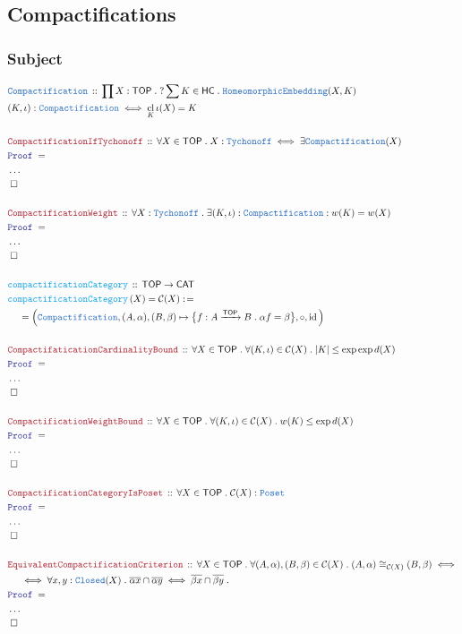\documentclass[12pt]{scrartcl}
\newcommand{\TYPE}[1]{\textcolor{NavyBlue}{\mathtt{#1}}}
\newcommand{\FUNC}[1]{\textcolor{Cerulean}{\mathtt{#1}}}
\newcommand{\LOGIC}[1]{\textcolor{Blue}{\mathtt{#1}}}
\newcommand{\THM}[1]{\textcolor{Maroon}{\mathtt{#1}}}
\renewcommand{\.}{\; . \;}
\newcommand{\de}{: \kern 0.1pc =}
\newcommand{\Act}[1]{\left( #1 \right)}
\newcommand{\Theorem}[2]{& \THM{#1} \, :: \, #2 \\ & \Proof = \\ }
\newcommand{\DeclareType}[2]{& \TYPE{#1} \, :: \, #2 \\}
\newcommand{\DefineType}[3]{& #1 : \TYPE{#2} \iff #3 \\}
\newcommand{\DeclareFunc}[2]{& \FUNC{#1} \, :: \, #2 \\}
\newcommand{\DefineNamedFunc}[4]{&  \FUNC{#1}\Act{#2} = #3 \de #4 \\}
\newcommand{\NewLine}{\\ & \kern 1pc}
\newcommand{\Page}[1]{ \begin{align*} #1 \end{align*}   }
\newcommand{\NoProof}{ & \ldots \\ \EndProof}
\DeclareMathOperator*{\id}{id}
\newcommand{\Arrow}{\xrightarrow}
\newcommand{\QED}{\; \square}
\newcommand{\EndProof}{& \QED \\}
\newcommand{\Proof}{\LOGIC{Proof} \; }
\newcommand{\C}{\mathcal{C}}
\newcommand{\CAT}{\mathsf{CAT}}
\DeclareMathOperator*{\cl}{cl}
\newcommand{\TOP}{\mathsf{TOP}}
\newcommand{\HC}{\mathsf{HC}}
\begin{document}
\subsection{Compactifications}
\subsubsection{Subject}
\Page{
	\DeclareType{Compactification}
	{
		\prod X : \TOP \.  
		?\sum  K \in \HC \.
		\TYPE{HomeomorphicEmbedding}(X,K) 
	}
	\DefineType{(K,\iota)}{Compactification}{\cl_K \iota(X) = K}
	\\
	\Theorem{CompactificationIfTychonoff}
	{
		\forall  X \in \TOP \.
		X : \TYPE{Tychonoff} \iff 
		\exists \TYPE{Compactification}(X)
	}
	\NoProof
	\\
	\Theorem{CompactificationWeight}
	{
		\forall X : \TYPE{Tychonoff} \.
		\exists (K,\iota) : \TYPE{Compactification} :
		w(K) = w(X)
	}
	\NoProof
	\\
	\DeclareFunc{compactificationCategory}{ \TOP \to \CAT}
	\DefineNamedFunc{compactificationCategory}{X}{\C(X)} 
	{
		\NewLine = 
		\Big( \TYPE{Compactification},(A,\alpha),(B,\beta) \mapsto \big\{ f : A \Arrow{\TOP} B \. 
		\alpha f = \beta \big\}, \circ, \id \Big)
	}
	\\
	\Theorem{CompactifaticationCardinalityBound}
	{
		\forall X \in \TOP \. \forall (K,\iota) \in \C(X) \.  |K| \le \exp \exp d(X) 
	}
	\NoProof
	\\
	\Theorem{CompactificationWeightBound}
	{
		\forall X \in \TOP \. \forall (K,\iota) \in \C(X) \. w(K) \le \exp d(X)
	}
	\NoProof
	\\
	\Theorem{CompactificationCategoryIsPoset}{\forall X \in \TOP \. \C(X) : \TYPE{Poset}}
	\NoProof
	\\
	\Theorem{EquivalentCompactificationCriterion}
	{
		\forall X \in \TOP \. 
		\forall (A,\alpha), (B,\beta) \in \C(X) \.
		(A,\alpha) \cong_{\C(X)} (B,\beta) \iff \NewLine \iff
		\forall x,y : \TYPE{Closed}(X) \.
		\overline{\alpha x} \cap \overline{\alpha y} 
		\iff
		\overline{\beta x} \cap \overline{\beta y} \.
	}
	\NoProof
}
\end{document}
